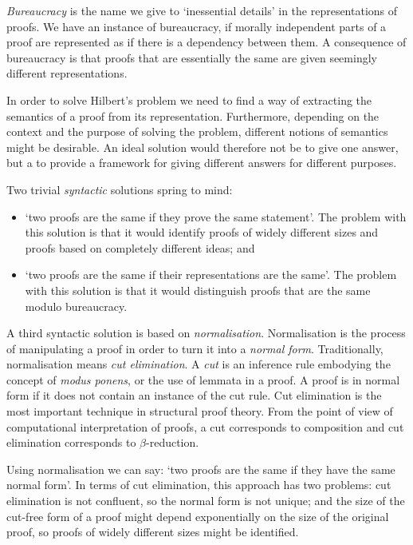 \emph{Bureaucracy} is the name we give to `inessential details' in the representations of proofs. We have an instance of  bureaucracy, if morally independent parts of a proof are represented as if there is a dependency between them. A consequence of bureaucracy is that proofs that are essentially the same are given seemingly different representations.

In order to solve Hilbert's problem we need to find a way of extracting the semantics of a proof from its representation. Furthermore, depending on the context and the purpose of solving the problem, different notions of semantics might be desirable. An ideal solution would therefore not be to give one answer, but a to provide a framework for giving different answers for different purposes.

Two trivial \emph{syntactic} solutions spring to mind:
\begin{itemize}
 \item `two proofs are the same if they prove the same statement'. The problem with this solution is that it would identify proofs of widely different sizes and proofs based on completely different ideas; and
 \item `two proofs are the same if their representations are the same'. The problem with this solution is that it would distinguish proofs that are the same modulo bureaucracy.
\end{itemize}

A third syntactic solution is based on \emph{normalisation}. Normalisation is the process of manipulating a proof in order to turn it into a \emph{normal form}. Traditionally, normalisation means \emph{cut elimination}. A \emph{cut} is an inference rule embodying the concept of \emph{modus ponens}, or the use of lemmata in a proof. A proof is in normal form if it does not contain an instance of the cut rule. Cut elimination is the most important technique in structural proof theory. From the point of view of computational interpretation of proofs, a cut corresponds to composition and cut elimination corresponds to $\beta$-reduction.

Using normalisation we can say: `two proofs are the same if they have the same normal form'. In terms of cut elimination, this approach has two problems: cut elimination is not confluent, so the normal form is not unique; and the size of the cut-free form of a proof might depend exponentially  on the size of the original proof, so proofs of widely different sizes might be identified.

